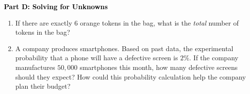 \documentclass[12pt, letterpaper, fleqn]{article}
\newcommand{\blank}{\underline{\hspace{2.2cm}}}
\begin{document}
\newpage

\begin{tcolorbox}[colback=customteal!20]
\large\textcolor{black}{\textbf{Part D: Solving for Unknowns}}
\end{tcolorbox}

\vspace{3mm}

\begin{enumerate}[itemsep=5.5cm, leftmargin=0.6cm, resume]
\item If there are exactly $6$ orange tokens in the bag, what is the \textit{total} number of tokens in the bag? \blank
\item A company produces smartphones. Based on past data, the experimental probability that a phone will have a defective screen is $2\%$. If the company manufactures $50,000$ smartphones this month, how many defective screens should they expect? How could this probability calculation help the company plan their budget?
\end{enumerate}
\end{document}
